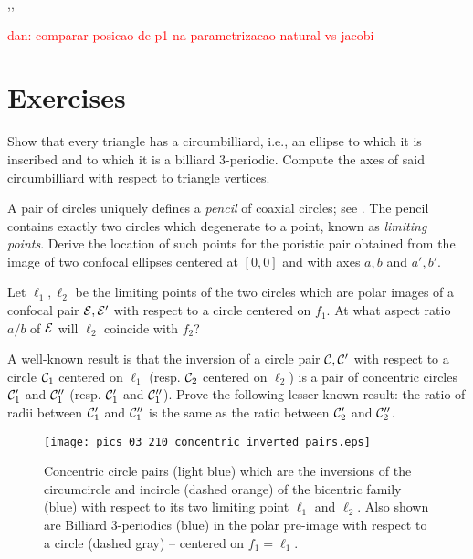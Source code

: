 \cite{stachel2021-billiards},\cite{reznik2021-n3-spatiotemporal},\cite{reznik2021-n3-jacobi}

\textcolor{red}{dan: comparar posicao de p1 na parametrizacao natural vs jacobi}

\section{Exercises}

\begin{exercise}
\label{ex:03-circumbilliard} 
Show that every triangle has a circumbilliard, i.e., an ellipse to which it is inscribed and to which it is a billiard 3-periodic. Compute the axes of said circumbilliard with respect to triangle vertices. 
\end{exercise}

\begin{exercise}
A pair of circles uniquely defines a {\em pencil} of coaxial circles; see \cite[Limiting Points]{mw}. The pencil contains exactly two circles which degenerate to a point, known as {\em limiting points}. Derive the location of such points for the poristic pair obtained from the image of two confocal ellipses centered at $[0,0]$ and with axes $a,b$ and $a',b'$.
\end{exercise}

\begin{exercise}
Let $\ell_1,\ell_2$ be the limiting points of the two circles which are polar images of a confocal pair $\mathcal{E},\mathcal{E}'$ with respect to a circle centered on $f_1$. At what aspect ratio $a/b$ of $\mathcal{E}$ will $\ell_2$ coincide with $f_2$?
\end{exercise}

\begin{exercise}
A well-known result is that the inversion of a circle pair $\mathcal{C},\mathcal{C}'$ with respect to a circle $\mathcal{C}_1$ centered on $\ell_1$ (resp. $\mathcal{C}_2$ centered on $\ell_2$) is a pair of concentric circles $\mathcal{C}_1'$ and $\mathcal{C}_1''$ (resp. $\mathcal{C}_1'$ and $\mathcal{C}_1''$). Prove the following lesser known result: the ratio of radii between $\mathcal{C}_1'$ and $\mathcal{C}_1''$ is the same as the ratio between $\mathcal{C}_2'$ and $\mathcal{C}_2''$. 
\end{exercise}


\begin{figure}
    \centering
    \texttt{[image: pics\_03\_210\_concentric\_inverted\_pairs.eps]}
    \caption{Concentric circle pairs (light blue) which are the inversions of the circumcircle and incircle (dashed orange) of the bicentric family  (blue) with respect to its two limiting point $\ell_1$ and $\ell_2$. Also shown are Billiard 3-periodics (blue) in the polar pre-image with respect to a circle (dashed gray) -- centered on $f_1=\ell_1$.}
    \label{fig:03-concentric-inverted}
\end{figure}

